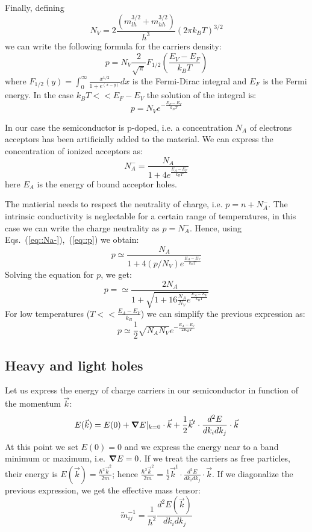 \documentclass[11pt,a4paper]{article}
\begin{document}
Finally, defining 
\begin{equation}
N_V=2\frac{(m_{lh}^{3/2}+m_{hh}^{3/2})}{h^3}(2\pi k_BT)^{3/2}
\end{equation} we can write the following formula for the carriers density:
\begin{equation}
p=N_V\frac{2}{\sqrt{\pi}}F_{1/2}\left(\frac{E_V-E_F}{k_BT}\right)
\end{equation} where $F_{1/2}(y)=\int_0^\infty\frac{x^{1/2}}{1+e^{(x-y)}}dx$ is the Fermi-Dirac integral and $E_F$ is the Fermi energy. In the case $k_BT<<E_F-E_V$ the solution of the integral is:
\begin{equation}
p=N_Ve^{-\frac{E_F-E_V}{k_BT}}\label{eq::p}
\end{equation}

In our case the semiconductor is p-doped, i.e. a concentration $N_A$ of electrons acceptors has been artificially added to the material. We can express the concentration of ionized acceptors as:
\begin{equation}
N_A^-=\frac{N_A}{1+4e^{\frac{E_A-E_F}{k_BT}}}\label{eq::Na-}
\end{equation}
here $E_A$ is the energy of bound acceptor holes.

The matierial needs to respect the neutrality of charge, i.e. $p=n+N_A^-$. The intrinsic conductivity is neglectable for a certain range of temperatures, in this case we can write the charge neutrality as $p=N_A^-$. Hence, using Eqs.~(\ref{eq::Na-}),~(\ref{eq::p}) we obtain:
\begin{equation}
p\simeq\frac{N_A}{1+4(p/N_V)e^{\frac{E_A-E_V}{k_BT}}}
\end{equation}
Solving the equation for $p$, we get:
\begin{equation}
p=\simeq\frac{2N_A}{1+\sqrt{1+16\frac{N_A}{N_V}e^\frac{E_A-E_V}{k_BT}}}
\end{equation}For low temperatures ($T<<\frac{E_A-E_V}{k_B}$) we can simplify the previous expression as:
\begin{equation}
p\simeq \frac{1}{2}\sqrt{N_AN_V}e^{-\frac{E_A-E_V}{2K_BT}}
\end{equation}
\subsection{Heavy and light holes}
Let us express the energy of charge carriers in our semiconductor in function of the momentum $\vec{k}$:
\begin{equation}
E(\vec{k})=E(0)+\grad E|_{k=0}\cdot \vec{k}+\frac{1}{2}\vec{k}^t\cdot\frac{d^2E}{dk_idk_j}\cdot\vec{k}
\end{equation}
At this point we set $E(0)=0$ and we express the energy near to a band minimum or maximum, i.e. $\grad E=0$. If we treat the carriers as free particles, their energy is $E(\vec{k})=\frac{\hbar^2\vec{k}^2}{2m}$; hence $\frac{\hbar^2\vec{k}^2}{2m}=\frac{1}{2}\vec{k}^t\cdot\frac{d^2E}{dk_idk_j}\cdot\vec{k}$. If we diagonalize the previous expression, we get the effective mass tensor:
\begin{equation}
\overleftrightarrow{m}_{ij}^{-1}=\frac{1}{\hbar^2}\frac{d^2E(\vec{k})}{dk_idk_j}
\end{equation}
\end{document}
